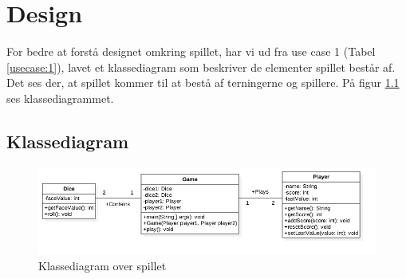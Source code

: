 \chapter{Design}

For bedre at forstå designet omkring spillet, har vi ud fra use case 1 (Tabel \ref{usecase:1}), lavet et klassediagram som beskriver de elementer spillet består af.
Det ses der, at spillet kommer til at bestå af terningerne og spillere.
På figur \ref{fig:klassediagram} ses klassediagrammet.

\section{Klassediagram}

\begin{figure}[h]
    \begin{center}
        \includegraphics[width=15cm]{graphics/Klassediagram}
        \caption{Klassediagram over spillet}
        \label{fig:klassediagram}
    \end{center}
\end{figure}